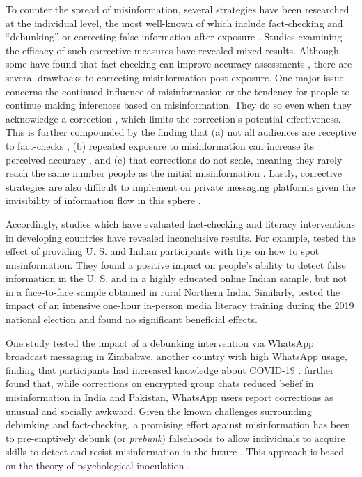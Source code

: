 \documentclass[empirical, authordate]{jote-new-article}
\begin{document}
To counter the spread of misinformation, several strategies have been researched at the individual level, the most well-known of which include fact-checking and “debunking” or correcting false information after exposure \parencite{Ecker2022, vanderLinden2022, Walter2018}. Studies examining the efficacy of such corrective measures have revealed mixed results. Although some have found that fact-checking can improve accuracy assessments \parencite{Clayton2020, Porter2021, Walter2018}, there are several drawbacks to correcting misinformation post-exposure. One major issue concerns the continued influence of misinformation or the tendency for people to continue making inferences based on misinformation. They do so even when they acknowledge a correction \parencite{Ecker2022, Lewandowsky2012}, which limits the correction's potential effectiveness. This is further compounded by the finding that (a) not all audiences are receptive to fact-checks \parencite{Walter2020}, (b) repeated exposure to misinformation can increase its perceived accuracy \parencite{Pennycook2018, Swire2017}, and (c) that corrections do not scale, meaning they rarely reach the same number people as the initial misinformation \parencite{Roozenbeek2019, vanderLinden2022}. Lastly, corrective strategies are also difficult to implement on private messaging platforms given the invisibility of information flow in this sphere \parencite{Reis2020}.

Accordingly, studies which have evaluated fact-checking and literacy interventions in developing countries have revealed inconclusive results. For example, \textcite{Guess2020} tested the effect of providing U. S. and Indian participants with tips on how to spot misinformation. They found a positive impact on people's ability to detect false information in the U. S. and in a highly educated online Indian sample, but not in a face-to-face sample obtained in rural Northern India. Similarly, \textcite{Badrinathan2021} tested the impact of an intensive one-hour in-person media literacy training during the 2019 national election and found no significant beneficial effects.

One study tested the impact of a debunking intervention via \mbox{WhatsApp} broadcast messaging in Zimbabwe, another country with high \mbox{WhatsApp} usage, finding that participants had increased knowledge about COVID-19 \parencite{Bowles2020}. \textcite{Pasquetto2020} further found that, while corrections on encrypted group chats reduced belief in misinformation in India and Pakistan, \mbox{WhatsApp} users report corrections as unusual and socially awkward. Given the known challenges surrounding debunking and fact-checking, a promising effort against misinformation has been to pre-emptively debunk (or \emph{prebunk}) falsehoods to allow individuals to acquire skills to detect and resist misinformation in the future \parencite{Lewandowsky2021}. This approach is based on the theory of psychological inoculation \parencite{McGuire1961}.
\end{document}
